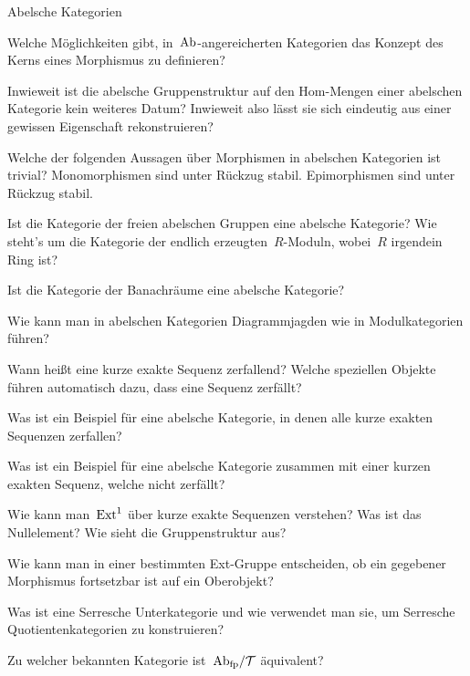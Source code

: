 \documentclass{uebblatt}
\begin{document}
\begin{aufgabeE}{Abelsche Kategorien}
\item Welche Möglichkeiten gibt, in~$\mathrm{Ab}$-angereicherten Kategorien das Konzept
des Kerns eines Morphismus zu definieren?
\item Inwieweit ist die abelsche Gruppenstruktur auf den Hom-Mengen einer
abelschen Kategorie kein weiteres Datum? Inwieweit also lässt sie sich
eindeutig aus einer gewissen Eigenschaft rekonstruieren?
\item Welche der folgenden Aussagen über Morphismen in abelschen Kategorien ist
trivial? Monomorphismen sind unter Rückzug stabil. Epimorphismen sind unter
Rückzug stabil.
\item Ist die Kategorie der freien abelschen Gruppen eine abelsche Kategorie?
Wie steht's um die Kategorie der endlich erzeugten~$R$-Moduln, wobei~$R$
irgendein Ring ist?
\item Ist die Kategorie der Banachräume eine abelsche Kategorie?
\item Wie kann man in abelschen Kategorien Diagrammjagden wie in
Modulkategorien führen?
\item Wann heißt eine kurze exakte Sequenz zerfallend? Welche speziellen
Objekte führen automatisch dazu, dass eine Sequenz zerfällt?
\item Was ist ein Beispiel für eine abelsche Kategorie, in denen alle kurze
exakten Sequenzen zerfallen?
\item Was ist ein Beispiel für eine abelsche Kategorie zusammen mit einer
kurzen exakten Sequenz, welche nicht zerfällt?
\item Wie kann man~$\mathrm{Ext}^1$ über kurze exakte Sequenzen verstehen? Was ist das
Nullelement? Wie sieht die Gruppenstruktur aus?
\item Wie kann man in einer bestimmten Ext-Gruppe entscheiden, ob ein gegebener
Morphismus fortsetzbar ist auf ein Oberobjekt?
\item Was ist eine Serresche Unterkategorie und wie verwendet man sie, um
Serresche Quotientenkategorien zu konstruieren?
\item Zu welcher bekannten Kategorie ist~$\mathrm{Ab}_\text{fp}/\mathcal{T}$ äquivalent?
\end{aufgabeE}
\end{document}
